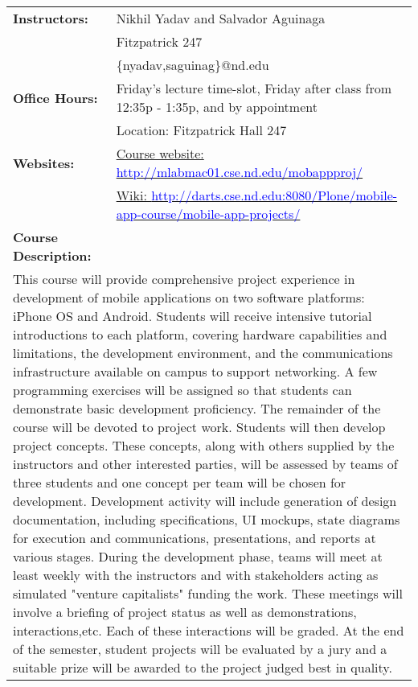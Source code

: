 \begin{center}
\begin{longtable}{ p{} p{} }
\textbf{Instructors:} & Nikhil Yadav and Salvador Aguinaga \\
& Fitzpatrick 247 \\
& \{nyadav,saguinag\}@nd.edu \\
\textbf{Office Hours:} & Friday's lecture time-slot, Friday after class from 12:35p - 1:35p, and by appointment\\
& Location: Fitzpatrick Hall 247 \\
\textbf{Websites:} & \href{http://mlabmac01.cse.nd.edu/mobappproj/}
{Course website: 
\textcolor{blue}{\url{http://mlabmac01.cse.nd.edu/mobappproj/}}}\\
				   & \href{http://darts.cse.nd.edu:8080/Plone/mobile-app-course/mobile-app-projects/}{Wiki: 
\textcolor{blue}{\url{http://darts.cse.nd.edu:8080/Plone/mobile-app-course/mobile-app-projects/}}}\\
\textbf{Course Description:} & \\
\multicolumn{2}{p{1\textwidth}}{\small This course will provide comprehensive project experience in development of mobile applications on two software platforms: iPhone OS and Android. Students will receive intensive tutorial introductions to each platform, covering hardware capabilities and limitations, the development environment, and the communications infrastructure available on campus to support networking. A few programming exercises will be assigned so that students can demonstrate basic development proficiency. The remainder of the course will be devoted to project work. Students will then develop project concepts. These concepts, along with others supplied by the instructors and other interested parties, will be assessed by teams of three students and one concept per team will be chosen for development. Development activity will include generation of design documentation, including specifications, UI mockups, state diagrams for execution and communications, presentations, and reports at various stages. During the development phase, teams will meet at least weekly with the instructors and with stakeholders acting as simulated "venture capitalists" funding the work. These meetings will involve a briefing of project status as well as demonstrations, interactions,etc. Each of these interactions will be graded. At the end of the semester, student projects will be evaluated by a jury and a suitable prize will be awarded to the project judged best in quality.} \\


\end{longtable}
\end{center}
